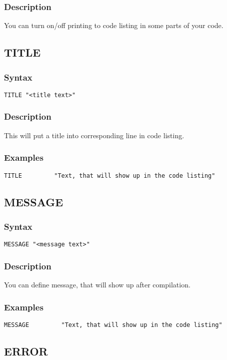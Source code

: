         \subsubsection{Description}
            You can turn on/off printing to code listing in some parts of your code.

    \subsection{TITLE}
        \subsubsection{Syntax}
            \verb'TITLE "<title text>"'

        \subsubsection{Description}
            This will put a title into corresponding line in code listing.

        \subsubsection{Examples}
            \verb'TITLE         "Text, that will show up in the code listing"'

    \subsection{MESSAGE}
        \subsubsection{Syntax}
            \verb'MESSAGE "<message text>"'

        \subsubsection{Description}
            You can define message, that will show up after compilation.

        \subsubsection{Examples}
            \verb'MESSAGE         "Text, that will show up in the code listing"'

    \subsection{ERROR}

